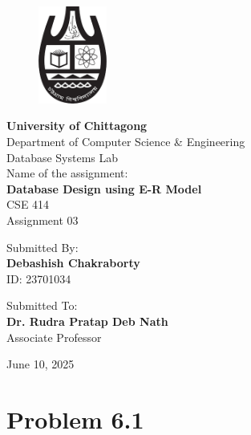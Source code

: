 \documentclass[12pt,a4paper]{article}
\begin{document}
\begin{titlepage}
    \begin{figure}[htbp]
    \centering
    \includegraphics[width=0.2\textwidth]{cu.png}
    \end{figure}
    \centering
    \vspace*{0.5cm}
    {\Huge\bfseries University of Chittagong}\\[0.5cm]
    {\Large Department of Computer Science \& Engineering}\\[0.5cm]
    {\large Database Systems Lab}\\[2cm]
    
    {\large Name of the assignment:}\\[0.3cm]
    {\LARGE\bfseries Database Design using E-R Model}\\[0.5cm]
    {\large CSE 414}\\[0.5cm]
    {\large Assignment 03}\\[3cm]
    
    \begin{minipage}[t]{0.4\textwidth}
    \raggedleft
    Submitted By:\\
    \large \textbf{Debashish Chakraborty}\\
    \large ID: 23701034
    \end{minipage}
    \hspace{0.05\textwidth}
    \vrule width 1pt
    \hspace{0.05\textwidth}
    \begin{minipage}[t]{0.4\textwidth}
    Submitted To:\\
    \large \textbf{Dr. Rudra Pratap Deb Nath}\\
    \large Associate Professor
    \end{minipage}
    
    \vfill
    {\large June 10, 2025}
\end{titlepage}

\newpage


\section*{Problem 6.1}
\end{document}
